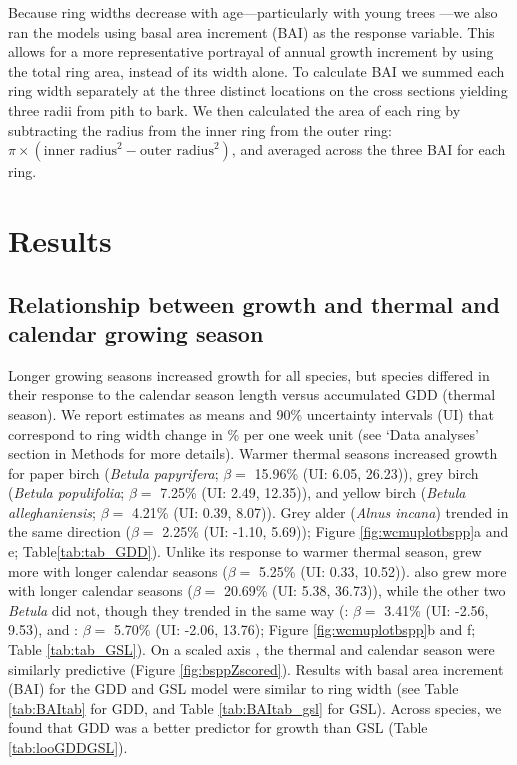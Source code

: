 \documentclass{article}\usepackage[]{graphicx}\usepackage[]{xcolor}
\begin{document}
Because ring widths decrease with age---particularly with young trees \citep{fritts_dendroecology_1989}---we also ran the models using basal area increment (BAI) as the response variable. This allows for a more representative portrayal of annual growth increment by using the total ring area, instead of its width alone. To calculate BAI we summed each ring width separately at the three distinct locations on the cross sections yielding three radii from pith to bark. We then calculated the area of each ring by subtracting the radius from the inner ring from the outer ring: $\pi \times (\text{inner radius}^2 - \text{outer radius}^2)$, and averaged across the three BAI for each ring. 


\section{Results}

\subsection*{Relationship between growth and thermal and calendar growing season}
Longer growing seasons increased growth for all species, but species differed in their response to the calendar season length versus accumulated GDD (thermal season). We report estimates as means and 90\% uncertainty intervals (UI) that correspond to ring width change in \% per one week unit (see `Data analyses' section in Methods for more details).
Warmer thermal seasons increased growth for paper birch (\textit{Betula papyrifera}; $\beta =$
15.96\% (UI: 6.05, 26.23)), grey birch (\textit{Betula populifolia}; $\beta =$
7.25\% (UI: 2.49, 12.35)), and yellow birch (\textit{Betula alleghaniensis}; $\beta =$
4.21\% (UI: 0.39, 8.07)). Grey alder (\textit{Alnus incana}) trended in the same direction ($\beta =$ 
2.25\% (UI: -1.10, 5.69)); Figure \ref{fig:wcmuplotbspp}a and e; Table\ref{tab:tab_GDD}).
Unlike its response to warmer thermal season, {\Ainc} grew more with longer calendar seasons ($\beta =$
5.25\% (UI: 0.33, 10.52)). {\Bpap} also grew more with longer calendar seasons ($\beta =$ 
20.69\% (UI: 5.38, 36.73)), while the other two \textit{Betula} did not, though they trended in the same way ({\Ball}: $\beta =$
3.41\% (UI: -2.56, 9.53), and {\Bpop}: $\beta =$
5.70\% (UI: -2.06, 13.76); Figure \ref{fig:wcmuplotbspp}b and f; Table \ref{tab:tab_GSL}). 
On a scaled axis \citep[through $z$-scoring,][]{gelman_data_2006}, the thermal and calendar season were similarly predictive (Figure \ref{fig:bsppZscored}). Results with basal area increment (BAI) for the GDD and GSL model were similar to ring width (see Table \ref{tab:BAItab} for GDD, and Table \ref{tab:BAItab_gsl} for GSL). Across species, we found that GDD was a better predictor for growth than GSL (Table \ref{tab:looGDDGSL}).
\end{document}
